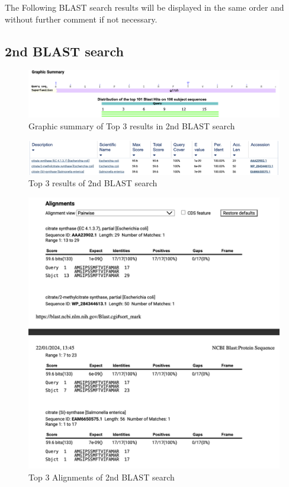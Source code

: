 \documentclass[a4paper,english,12pt,bibliography=totoc]{scrreprt}
\begin{document}
The Following BLAST search results will be displayed in the same order and without further comment if not necessary.

\subsection{2nd BLAST search }

\begin{figure}[H]
    \centering
    \includegraphics[width=0.9\linewidth]{Project 1/2nd Images/graphic summary.png}
    \caption{Graphic summary of Top 3 results in 2nd BLAST search}
    \label{fig:enter-label}
\end{figure}


\begin{figure}[H]
    \centering
    \includegraphics[width=0.9\linewidth]{Project 1/2nd Images/Blast results.png}
    \caption{Top 3 results of 2nd BLAST search}
\end{figure}


\begin{figure}[H]
    \centering
    \includegraphics[width=0.9\linewidth]{Project 1/2nd Images/Alignments.png}
    \caption{Top 3 Alignments of 2nd BLAST search}
    \label{fig:enter-label}
\end{figure}
\end{document}
